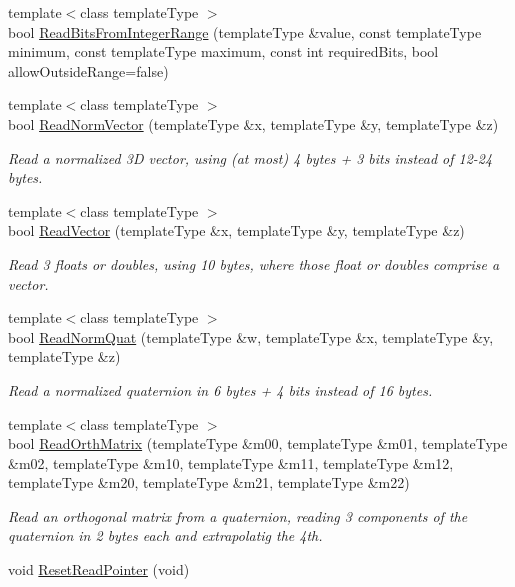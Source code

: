\begin{DoxyCompactItemize}
\item 
{\footnotesize template$<$class template\-Type $>$ }\\bool \hyperlink{class_rak_net_1_1_bit_stream_ae2ebc24f3cf193f77d7cd4c3e1eaf22f}{Read\-Bits\-From\-Integer\-Range} (template\-Type \&value, const template\-Type minimum, const template\-Type maximum, const int required\-Bits, bool allow\-Outside\-Range=false)
\item 
{\footnotesize template$<$class template\-Type $>$ }\\bool \hyperlink{class_rak_net_1_1_bit_stream_aaa9b48a07801cb8628dd5523a275a917}{Read\-Norm\-Vector} (template\-Type \&x, template\-Type \&y, template\-Type \&z)
\begin{DoxyCompactList}\small\item\em Read a normalized 3\-D vector, using (at most) 4 bytes + 3 bits instead of 12-\/24 bytes. \end{DoxyCompactList}\item 
{\footnotesize template$<$class template\-Type $>$ }\\bool \hyperlink{class_rak_net_1_1_bit_stream_a1c0d350e53bc70d3d24def9b6bbf62ba}{Read\-Vector} (template\-Type \&x, template\-Type \&y, template\-Type \&z)
\begin{DoxyCompactList}\small\item\em Read 3 floats or doubles, using 10 bytes, where those float or doubles comprise a vector. \end{DoxyCompactList}\item 
{\footnotesize template$<$class template\-Type $>$ }\\bool \hyperlink{class_rak_net_1_1_bit_stream_ad6ec569c23a95f8ee46ec36c4b8303da}{Read\-Norm\-Quat} (template\-Type \&w, template\-Type \&x, template\-Type \&y, template\-Type \&z)
\begin{DoxyCompactList}\small\item\em Read a normalized quaternion in 6 bytes + 4 bits instead of 16 bytes. \end{DoxyCompactList}\item 
{\footnotesize template$<$class template\-Type $>$ }\\bool \hyperlink{class_rak_net_1_1_bit_stream_a542c53992e9896cddb7a1bd96bce06ff}{Read\-Orth\-Matrix} (template\-Type \&m00, template\-Type \&m01, template\-Type \&m02, template\-Type \&m10, template\-Type \&m11, template\-Type \&m12, template\-Type \&m20, template\-Type \&m21, template\-Type \&m22)
\begin{DoxyCompactList}\small\item\em Read an orthogonal matrix from a quaternion, reading 3 components of the quaternion in 2 bytes each and extrapolatig the 4th. \end{DoxyCompactList}\item 
\hypertarget{class_rak_net_1_1_bit_stream_aaa64a4efffbfc9f5e527061bb82126b8}{void \hyperlink{class_rak_net_1_1_bit_stream_aaa64a4efffbfc9f5e527061bb82126b8}{Reset\-Read\-Pointer} (void)}\label{class_rak_net_1_1_bit_stream_aaa64a4efffbfc9f5e527061bb82126b8}


\end{DoxyCompactItemize}
